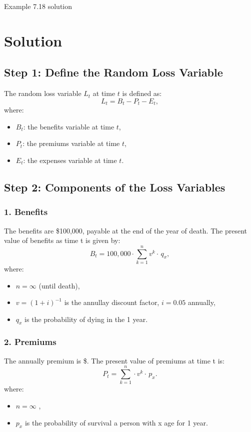 	\begin{solve}{}{Example 7.18 solution}
		\section*{Solution}
		
		\subsection*{Step 1: Define the Random Loss Variable}
		The random loss variable $L_t$ at time $t$ is defined as:
		\[
		L_t = B_t - P_t - E_t,
		\]
		where:
		\begin{itemize}
			\item $B_t$: the benefits variable at time $t$,
			\item $P_t$: the premiums variable  at time $t$,
			\item $E_t$: the expenses variable at time $t$.
		\end{itemize}
		
		\subsection*{Step 2: Components of the Loss Variables}
		\subsubsection*{1. Benefits}
		The benefits are \$100,000, payable at the end of the year of death. The present value of benefits as time t is given by:
		\[
		B_t = 100,000 \cdot \sum_{k=1}^{n} v^{k} \cdot \,q_{x},
		\]
		where:
		\begin{itemize}
			\item $n = \infty $ (until death),
			\item $v = (1+i)^{-1}$ is the annullay discount factor, $i = 0.05$ annually,
			\item $q_{x}$ is the probability of dying in the 1 year.
		\end{itemize}
		
		\subsubsection*{2. Premiums}
		The annually premium is \$. The present value of premiums at time t is:
		\[
		P_t = \sum_{k=1}^{n}   \cdot v^{k} \cdot \,p_{x}.
		\]
		where:
		\begin{itemize}
			\item $n = \infty$ ,
			\item $p_{x}$ is the probability of survival a person with x age for 1 year.
		\end{itemize}
		

\end{solve}
